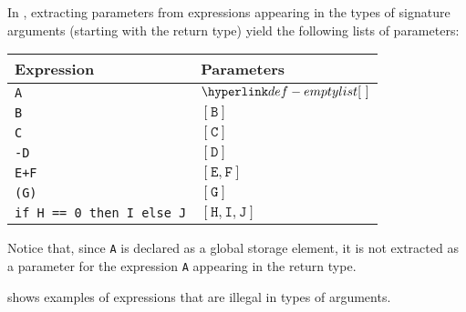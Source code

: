 In , extracting parameters from expressions appearing
in the types of signature arguments (starting with the return type) yield the following lists of parameters:
\begin{center}
\begin{tabular}{ll}
\textbf{Expression} & \textbf{Parameters}\\
\hline
\verb|A|      & $\emptylist$\\
\verb|B|      & $[\texttt{B}]$\\
\verb|C|      & $[\texttt{C}]$\\
\verb|-D|      & $[\texttt{D}]$\\
\verb|E+F|      & $[\texttt{E}, \texttt{F}]$\\
\verb|(G)|      & $[\texttt{G}]$\\
\verb|if H == 0 then I else J|      & $[\texttt{H}, \texttt{I}, \texttt{J}]$\\
\end{tabular}
\end{center}
Notice that, since \verb|A| is declared as a global storage element, it is not extracted as a parameter
for the expression \verb|A| appearing in the return type.


 shows examples of expressions that are illegal in types of arguments.

